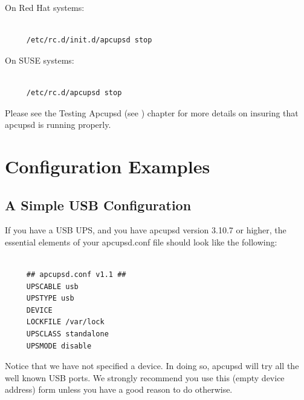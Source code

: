 On Red Hat systems: 

\footnotesize
\begin{verbatim}
     
     /etc/rc.d/init.d/apcupsd stop
\end{verbatim}
\normalsize

On SUSE systems: 

\footnotesize
\begin{verbatim}
     
     /etc/rc.d/apcupsd stop
\end{verbatim}
\normalsize

Please see the Testing Apcupsd (see 
) chapter for more details
on insuring that apcupsd is running properly. 

\label{Configuration-Examples}

\section*{Configuration Examples}

\label{index-Configuration_002c-Examples-63}
\label{index-Examples_002c-Configuration-64}

\label{A-Simple-USB-Configuration}

\subsection*{A Simple USB Configuration}

\label{index-Configuration_002c-USB-65}
\label{index-USB_002c-configuration-66}
\label{index-Example_002c-USB-conf-67}
If you have a USB UPS, and you have apcupsd version 3.10.7 or higher, the
essential elements of your apcupsd.conf file should look like the following: 

\footnotesize
\begin{verbatim}
     
     ## apcupsd.conf v1.1 ##
     UPSCABLE usb
     UPSTYPE usb
     DEVICE
     LOCKFILE /var/lock
     UPSCLASS standalone
     UPSMODE disable
\end{verbatim}
\normalsize

Notice that we have not specified a device. In doing so, apcupsd will try all
the well known USB ports. We strongly recommend you use this (empty device
address) form unless you have a good reason to do otherwise.  

